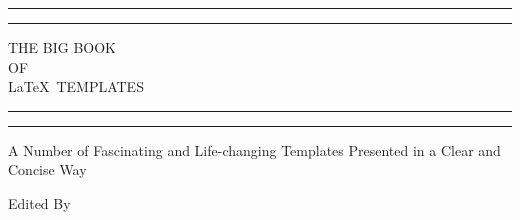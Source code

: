 \newcommand{\plogo}{\fbox{$\mathcal{PL}$}} %

\begin{titlepage} %

	\centering %

	\scshape %

	\vspace*{\baselineskip} %


	\rule{\textwidth}{1.6pt}\vspace*{-\baselineskip}\vspace*{2pt} %
	\rule{\textwidth}{0.4pt} %

	\vspace{0.75\baselineskip} %

	{\LARGE THE BIG BOOK\\ OF\\ \LaTeX ~TEMPLATES\\} %

	\vspace{0.75\baselineskip} %

	\rule{\textwidth}{0.4pt}\vspace*{-\baselineskip}\vspace{3.2pt} %
	\rule{\textwidth}{1.6pt} %

	\vspace{2\baselineskip} %


	A Number of Fascinating and Life-changing Templates Presented in a Clear and Concise Way %

	\vspace*{3\baselineskip} %


	Edited By

	\vspace{0.5\baselineskip} %


\end{titlepage}

